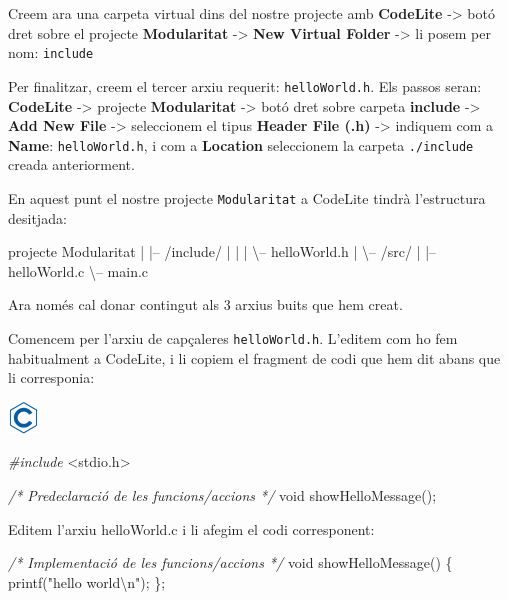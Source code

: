 \documentclass[]{book}
\newenvironment{Shaded}{\begin{snugshade}}{\end{snugshade}}
\newcommand{\DataTypeTok}[1]{\textcolor[rgb]{0.13,0.29,0.53}{#1}}
\newcommand{\SpecialCharTok}[1]{\textcolor[rgb]{0.00,0.00,0.00}{#1}}
\newcommand{\StringTok}[1]{\textcolor[rgb]{0.31,0.60,0.02}{#1}}
\newcommand{\ImportTok}[1]{#1}
\newcommand{\CommentTok}[1]{\textcolor[rgb]{0.56,0.35,0.01}{\textit{#1}}}
\newcommand{\PreprocessorTok}[1]{\textcolor[rgb]{0.56,0.35,0.01}{\textit{#1}}}
\newcommand{\NormalTok}[1]{#1}
\begin{document}
Creem ara una carpeta virtual dins del nostre projecte amb
\textbf{CodeLite} -\textgreater{} botó dret sobre el projecte
\textbf{Modularitat} -\textgreater{} \textbf{New Virtual Folder}
-\textgreater{} li posem per nom: \texttt{include}

Per finalitzar, creem el tercer arxiu requerit: \texttt{helloWorld.h}.
Els passos seran: \textbf{CodeLite} -\textgreater{} projecte
\textbf{Modularitat} -\textgreater{} botó dret sobre carpeta
\textbf{include} -\textgreater{} \textbf{Add New File} -\textgreater{}
seleccionem el tipus \textbf{Header File (.h)} -\textgreater{} indiquem
com a \textbf{Name}: \texttt{helloWorld.h}, i com a \textbf{Location}
seleccionem la carpeta \texttt{./include} creada anteriorment.

En aquest punt el nostre projecte \texttt{Modularitat} a CodeLite tindrà
l'estructura desitjada:

\begin{Shaded}
\begin{Highlighting}[]
\NormalTok{projecte Modularitat}
\NormalTok{   |}
\NormalTok{   |-- /include/}
\NormalTok{   |     |}
\NormalTok{   |     \textbackslash{}-- helloWorld.h}
\NormalTok{   |}
\NormalTok{   \textbackslash{}-- /src/}
\NormalTok{         |}
\NormalTok{         |-- helloWorld.c}
\NormalTok{         \textbackslash{}-- main.c}
\end{Highlighting}
\end{Shaded}

Ara només cal donar contingut als 3 arxius buits que hem creat.

Comencem per l'arxiu de capçaleres \texttt{helloWorld.h}. L'editem com
ho fem habitualment a CodeLite, i li copiem el fragment de codi que hem
dit abans que li corresponia:

\includegraphics{./img/c.png}

\begin{Shaded}
\begin{Highlighting}[]
\PreprocessorTok{#include }\ImportTok{<stdio.h>}

\CommentTok{/* Predeclaració de les funcions/accions */}
\DataTypeTok{void}\NormalTok{ showHelloMessage();}

\NormalTok{Editem l’arxiu helloWorld.c i li afegim el codi corresponent:}

\CommentTok{/* Implementació de les funcions/accions */}
\DataTypeTok{void}\NormalTok{ showHelloMessage() \{}
\NormalTok{    printf(}\StringTok{"hello world}\SpecialCharTok{\textbackslash{}n}\StringTok{"}\NormalTok{);}
\NormalTok{\};}
\end{Highlighting}
\end{Shaded}
\end{document}
